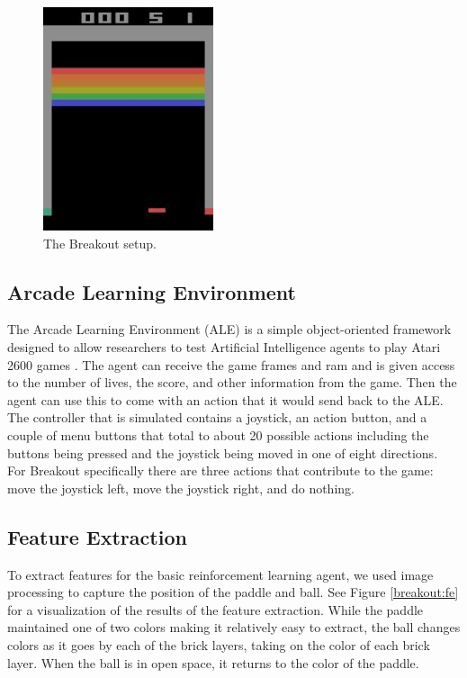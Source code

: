 \documentclass{article}
\begin{document}
\begin{figure}[H]
  \centering
  \includegraphics[width=50mm]{tmp.jpg}
  \caption{The Breakout setup.}
  \label{breakout:simple}
\end{figure}

\subsection{Arcade Learning Environment}
The Arcade Learning Environment (ALE) is a simple object-oriented framework designed to allow researchers to test Artificial Intelligence agents to play Atari 2600 games \cite{ale}. The agent can receive the game frames and ram and is given access to the number of lives, the score, and other information from the game. Then the agent can use this to come with an action that it would send back to the ALE. The controller that is simulated contains a joystick, an action button, and a couple of menu buttons that total to about 20 possible actions including the buttons being pressed and the joystick being moved in one of eight directions. \\

For Breakout specifically there are three actions that contribute to the game: move the joystick left, move the joystick right, and do nothing.

\subsection{Feature Extraction}
To extract features for the basic reinforcement learning agent, we used image processing to capture the position of the paddle and ball.  See Figure \ref{breakout:fe} for a visualization of the results of the feature extraction.  While the paddle maintained one of two colors making it relatively easy to extract, the ball changes colors as it goes by each of the brick layers, taking on the color of each brick layer.  When the ball is in open space, it returns to the color of the paddle. \\
\end{document}
